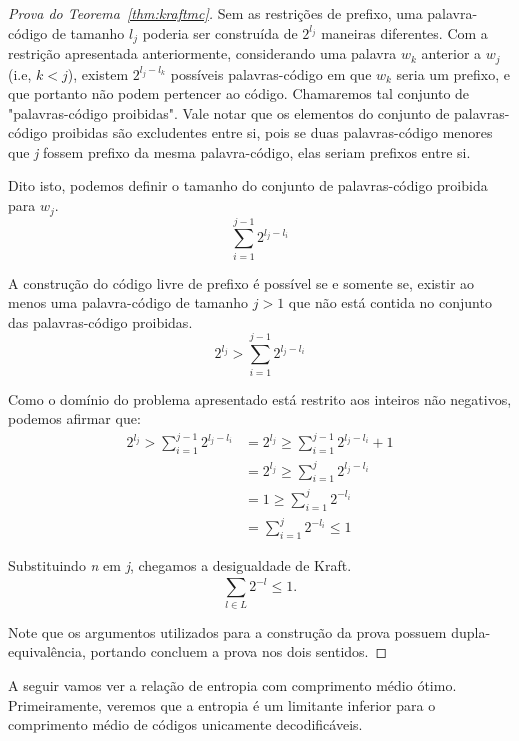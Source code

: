 \begin{proof}[Prova do Teorema~\ref{thm:kraftmc}]
Sem as restrições de prefixo, uma palavra-código de tamanho $l_j$ poderia ser construída de $2^{l_j}$ maneiras diferentes. Com a restrição apresentada anteriormente, considerando uma palavra $w_k$ anterior a $w_j$ (i.e, $k < j$), existem $2^{l_j - l_k}$ possíveis palavras-código em que $w_k$ seria um prefixo, e que portanto não podem pertencer ao código. Chamaremos tal conjunto de "palavras-código proibidas". Vale notar que os elementos do conjunto de palavras-código proibidas são excludentes entre si, pois se duas palavras-código menores que \emph{j} fossem prefixo da mesma palavra-código, elas seriam prefixos entre si. 

Dito isto, podemos definir o tamanho do conjunto de palavras-código proibida para $w_j$.
\begin{equation*}
\sum_{i=1}^{j-1} 2^{l_j - l_i}
\end{equation*}

A construção do código livre de prefixo é possível se e somente se, existir ao menos uma palavra-código de tamanho $j > 1$ que não está contida no conjunto das palavras-código proibidas.
\begin{equation*}
2^{l_j} > \sum_{i=1}^{j-1} 2^{l_j - l_i}
\end{equation*}

Como o domínio do problema apresentado está restrito aos inteiros não negativos, podemos afirmar que:
\begin{align*}
2^{l_j} > \sum_{i=1}^{j-1} 2^{l_j - l_i} &= 2^{l_j} \geq \sum_{i=1}^{j-1} 2^{l_j - l_i} + 1 \\
&= 2^{l_j} \geq \sum_{i=1}^{j} 2^{l_j - l_i} \\
&= 1 \geq \sum_{i=1}^{j} 2^{-l_i} \\
&=  \sum_{i=1}^{j} 2^{-l_i} \leq 1
\end{align*}

Substituindo \emph{n} em \emph{j}, chegamos a desigualdade de Kraft.
\begin{equation*}
\sum_{l \in L}^{} 2^{-l} \leq 1.
\end{equation*}

Note que os argumentos utilizados para a construção da prova possuem dupla-equivalência, portando concluem a prova nos dois sentidos.

\end{proof}

A seguir vamos ver a relação de entropia com comprimento médio
ótimo. Primeiramente, veremos que a entropia é um limitante inferior
para o comprimento médio de códigos unicamente decodificáveis.

